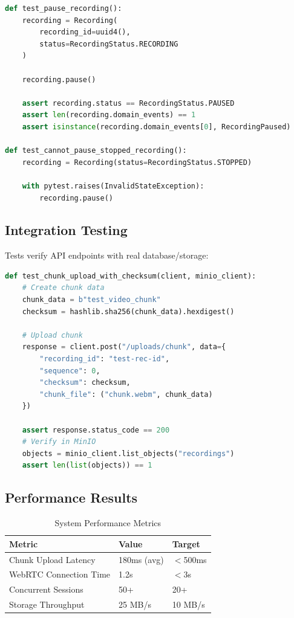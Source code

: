 \documentclass[12pt,a4paper]{article}
\begin{document}
\begin{lstlisting}[language=Python, caption=Recording Aggregate Tests, basicstyle=\ttfamily\scriptsize]
def test_pause_recording():
    recording = Recording(
        recording_id=uuid4(),
        status=RecordingStatus.RECORDING
    )

    recording.pause()

    assert recording.status == RecordingStatus.PAUSED
    assert len(recording.domain_events) == 1
    assert isinstance(recording.domain_events[0], RecordingPaused)

def test_cannot_pause_stopped_recording():
    recording = Recording(status=RecordingStatus.STOPPED)

    with pytest.raises(InvalidStateException):
        recording.pause()
\end{lstlisting}

\subsection{Integration Testing}

Tests verify API endpoints with real database/storage:

\begin{lstlisting}[language=Python, caption=API Integration Test, basicstyle=\ttfamily\scriptsize]
def test_chunk_upload_with_checksum(client, minio_client):
    # Create chunk data
    chunk_data = b"test_video_chunk"
    checksum = hashlib.sha256(chunk_data).hexdigest()

    # Upload chunk
    response = client.post("/uploads/chunk", data={
        "recording_id": "test-rec-id",
        "sequence": 0,
        "checksum": checksum,
        "chunk_file": ("chunk.webm", chunk_data)
    })

    assert response.status_code == 200
    # Verify in MinIO
    objects = minio_client.list_objects("recordings")
    assert len(list(objects)) == 1
\end{lstlisting}

\subsection{Performance Results}

\begin{table}[H]
\centering
\caption{System Performance Metrics}
\begin{tabular}{@{}lll@{}}
\toprule
\textbf{Metric} & \textbf{Value} & \textbf{Target} \\ \midrule
Chunk Upload Latency & 180ms (avg) & $<$500ms \\
WebRTC Connection Time & 1.2s & $<$3s \\
Concurrent Sessions & 50+ & 20+ \\
Storage Throughput & 25 MB/s & 10 MB/s \\
\bottomrule
\end{tabular}
\end{table}
\end{document}
